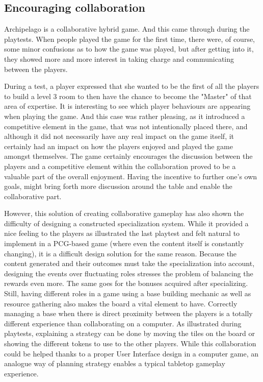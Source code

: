 \subsection{Encouraging collaboration} 
Archipelago is a collaborative hybrid game. And this came through during the playtests. When people played the game for the first time, there were, of course, some minor confusions as to how the game was played, but after getting into it, they showed more and more interest in taking charge and communicating between the players. 

During a test, a player expressed that she wanted to be the first of all the players to build a level 3 room to then have the chance to become the "Master" of that area of expertise. It is interesting to see which player behaviours are appearing when playing the game. And this case was rather pleasing, as it introduced a competitive element in the game, that was not intentionally placed there, and although it did not necessarily have any real impact on the game itself, it certainly had an impact on how the players enjoyed and played the game amongst themselves. The game certainly encourages the discussion between the players and a competitive element within the collaboration proved to be a valuable part of the overall enjoyment. Having the incentive to further one's own goals, might bring forth more discussion around the table and enable the collaborative part.

However, this solution of creating collaborative gameplay has also shown the difficulty of designing a constructed specialization system. While it provided a nice feeling to the players as illustrated the last playtest and felt natural to implement in a PCG-based game (where even the content itself is constantly changing), it is a difficult design solution for the same reason. Because the content generated and their outcomes must take the specialization into account, designing the events over fluctuating roles stresses the problem of balancing the rewards even more. The same goes for the bonuses acquired after specializing. Still, having different roles in a game using a base building mechanic as well as resource gathering also makes the board a vital element to have. Correctly managing a base when there is direct proximity between the players is a totally different experience than collaborating on a computer. As illustrated during playtests, explaining a strategy can be done by moving the tiles on the board or showing the different tokens to use to the other players. While this collaboration could be helped thanks to a proper User Interface design in a computer game, an analogue way of planning strategy enables a typical tabletop gameplay experience.

